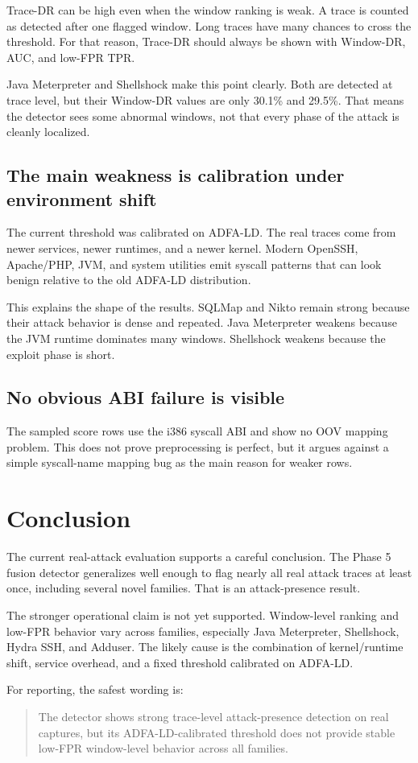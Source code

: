 \documentclass[11pt,a4paper]{article}
\begin{document}
Trace-DR can be high even when the window ranking is weak. A trace is counted as detected after one flagged window. Long traces have many chances to cross the threshold. For that reason, Trace-DR should always be shown with Window-DR, AUC, and low-FPR TPR.

Java Meterpreter and Shellshock make this point clearly. Both are detected at trace level, but their Window-DR values are only 30.1\% and 29.5\%. That means the detector sees some abnormal windows, not that every phase of the attack is cleanly localized.

\subsection{The main weakness is calibration under environment shift}

The current threshold was calibrated on ADFA-LD. The real traces come from newer services, newer runtimes, and a newer kernel. Modern OpenSSH, Apache/PHP, JVM, and system utilities emit syscall patterns that can look benign relative to the old ADFA-LD distribution.

This explains the shape of the results. SQLMap and Nikto remain strong because their attack behavior is dense and repeated. Java Meterpreter weakens because the JVM runtime dominates many windows. Shellshock weakens because the exploit phase is short.

\subsection{No obvious ABI failure is visible}

The sampled score rows use the i386 syscall ABI and show no OOV mapping problem. This does not prove preprocessing is perfect, but it argues against a simple syscall-name mapping bug as the main reason for weaker rows.

\section{Conclusion}

The current real-attack evaluation supports a careful conclusion. The Phase 5 fusion detector generalizes well enough to flag nearly all real attack traces at least once, including several novel families. That is an attack-presence result.

The stronger operational claim is not yet supported. Window-level ranking and low-FPR behavior vary across families, especially Java Meterpreter, Shellshock, Hydra SSH, and Adduser. The likely cause is the combination of kernel/runtime shift, service overhead, and a fixed threshold calibrated on ADFA-LD.

For reporting, the safest wording is:

\begin{quote}
The detector shows strong trace-level attack-presence detection on real captures, but its ADFA-LD-calibrated threshold does not provide stable low-FPR window-level behavior across all families.
\end{quote}
\end{document}
